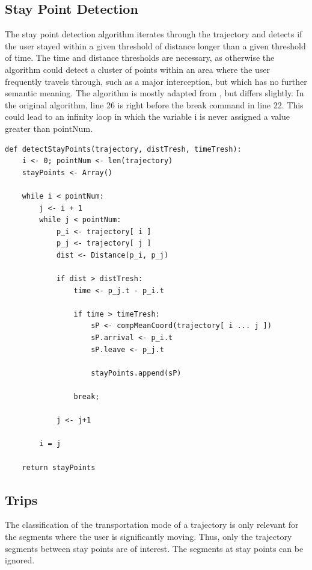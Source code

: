 \subsection{Stay Point Detection}

The stay point detection algorithm iterates through the trajectory and detects if the user stayed within a given threshold of distance longer than a given threshold of time. The time and distance thresholds are necessary, as otherwise the algorithm could detect a cluster of points within an area where the user frequently travels through, such as a major interception, but which has no further semantic meaning. The algorithm is mostly adapted from \cite{li2008mining}, but differs slightly. In the original algorithm, line 26 is right before the break command in line 22. This could lead to an infinity loop in which the variable i is never assigned a value greater than pointNum. \cite{li2008mining}

\begin{lstlisting}[style=py, caption={Pseudocode: Stay Point Detection \cite{li2008mining}}, label={code:stayPoint}]
def detectStayPoints(trajectory, distTresh, timeTresh):
    i <- 0; pointNum <- len(trajectory)
    stayPoints <- Array()
    
    while i < pointNum:
        j <- i + 1
        while j < pointNum:
            p_i <- trajectory[ i ]
            p_j <- trajectory[ j ]
            dist <- Distance(p_i, p_j)
            
            if dist > distTresh:
                time <- p_j.t - p_i.t
                
                if time > timeTresh:
                    sP <- compMeanCoord(trajectory[ i ... j ])
                    sP.arrival <- p_i.t
                    sP.leave <- p_j.t
                    
                    stayPoints.append(sP)
                
                break;
            
            j <- j+1
        
        i = j
    
    return stayPoints
\end{lstlisting}


\subsection{Trips}
The classification of the transportation mode of a trajectory is only relevant for the segments where the user is significantly moving. Thus, only the trajectory segments between stay points are of interest. The segments at stay points can be ignored.

